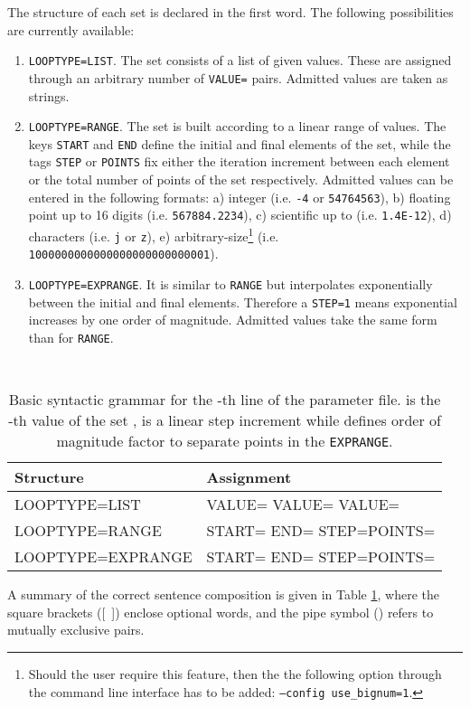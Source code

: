 \documentclass[12pt,a4paper]{article}
\newcommand{\tab}[1]{Table \ref{#1}}
\begin{document}
The structure of each set is declared in the first word. The following possibilities are currently available:
\begin{enumerate}
\item {\tt LOOPTYPE=LIST}. The set consists of a list of given values. These are assigned through an arbitrary number of {\tt VALUE=} pairs. Admitted values are taken as strings.
\item {\tt LOOPTYPE=RANGE}. The set is built according to a linear range of values. The keys {\tt START} and {\tt END} define the initial and final elements of the set, while the tags {\tt STEP} or {\tt POINTS} fix either the iteration increment between each element or the total number of points of the set respectively. Admitted values can be entered in the following formats:
\subitem a) integer (i.e. {\tt -4} or {\tt 54764563}),
\subitem b) floating point up to 16 digits (i.e. {\tt 567884.2234}),
\subitem c) scientific up to  (i.e. {\tt 1.4E-12}),
\subitem d) characters (i.e. {\tt j} or {\tt z}),
\subitem e) arbitrary-size\footnote{Should the user require this feature, then the the following option through the command line interface has to be added: {\tt --config use\_bignum=1}.} (i.e. {\tt 1000000000000000000000000001}).
\item {\tt LOOPTYPE=EXPRANGE}. It is similar to {\tt RANGE} but interpolates exponentially between the initial and final elements. Therefore a {\tt STEP=1} means exponential increases by one order of magnitude. Admitted values take the same form than for {\tt RANGE}.
\end{enumerate}
\begin{table}[!ht]
\center
{\tt
\begin{tabular}{ll}
\hline
\textrm{Structure} & \textrm{Assignment} \\
\hline
LOOPTYPE=LIST & VALUE= VALUE=  VALUE=\\
LOOPTYPE=RANGE & START= END= STEP=POINTS=\\
LOOPTYPE=EXPRANGE & START= END= STEP=POINTS=\\
\hline
\end{tabular}
}
\caption{Basic syntactic grammar for the -th line of the parameter file.  is the -th value of the set ,  is a linear step increment while  defines order of magnitude factor to separate points in the {\tt EXPRANGE}.}
\label{syntax}
\end{table}
A summary of the correct sentence composition is given in \tab{syntax}, where the square brackets ([~]) enclose optional words, and the pipe symbol () refers to mutually exclusive pairs.
\end{document}
